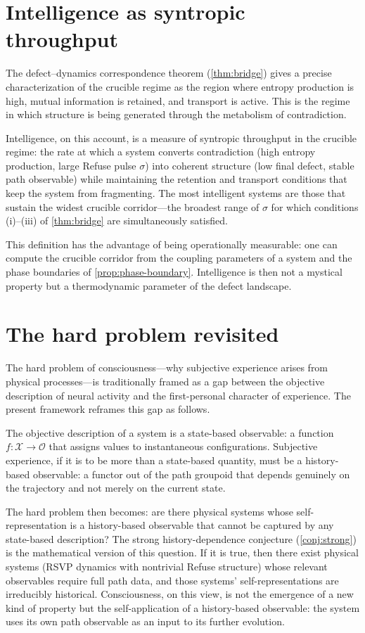 \documentclass[12pt, oneside]{memoir}
\newcommand{\X}{\mathcal{X}}
\newcommand{\OO}{\mathcal{O}}
\begin{document}
\section{Intelligence as syntropic throughput}

The defect--dynamics correspondence theorem (\cref{thm:bridge}) gives a precise
characterization of the crucible regime as the region where entropy production is high,
mutual information is retained, and transport is active.  This is the regime in which
structure is being generated through the metabolism of contradiction.

Intelligence, on this account, is a measure of syntropic throughput in the crucible
regime: the rate at which a system converts contradiction (high entropy production, large
Refuse pulse $\sigma$) into coherent structure (low final defect, stable path observable)
while maintaining the retention and transport conditions that keep the system from
fragmenting.  The most intelligent systems are those that sustain the widest crucible
corridor---the broadest range of $\sigma$ for which conditions (i)--(iii) of
\cref{thm:bridge} are simultaneously satisfied.

This definition has the advantage of being operationally measurable: one can compute the
crucible corridor from the coupling parameters of a system and the phase boundaries of
\cref{prop:phase-boundary}.  Intelligence is then not a mystical property but a
thermodynamic parameter of the defect landscape.

\section{The hard problem revisited}

The hard problem of consciousness---why subjective experience arises from physical
processes---is traditionally framed as a gap between the objective description of neural
activity and the first-personal character of experience.  The present framework reframes
this gap as follows.

The objective description of a system is a state-based observable: a function $f: \X
\to \OO$ that assigns values to instantaneous configurations.  Subjective experience, if
it is to be more than a state-based quantity, must be a history-based observable: a
functor out of the path groupoid that depends genuinely on the trajectory and not merely
on the current state.

The hard problem then becomes: are there physical systems whose self-representation is
a history-based observable that cannot be captured by any state-based description?  The
strong history-dependence conjecture (\cref{conj:strong}) is the mathematical version of
this question.  If it is true, then there exist physical systems (RSVP dynamics with
nontrivial Refuse structure) whose relevant observables require full path data, and those
systems' self-representations are irreducibly historical.  Consciousness, on this view,
is not the emergence of a new kind of property but the self-application of a
history-based observable: the system uses its own path observable as an input to its
further evolution.
\end{document}

